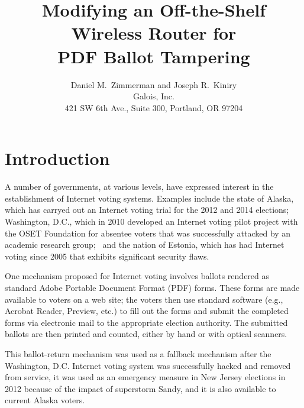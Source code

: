 \documentclass{article}
\newcommand{\eg}{e.g.,\xspace}
\newcommand{\etc}{etc.\xspace}
\begin{document}
\title{Modifying an Off-the-Shelf Wireless Router for \\ PDF Ballot Tampering}
\author{Daniel M.~Zimmerman and Joseph R.~Kiniry \\ Galois, Inc. \\
  421 SW 6th Ave., Suite 300, Portland, OR 97204}

\maketitle


\section{Introduction}

A number of governments, at various levels, have expressed interest in
the establishment of Internet voting systems. Examples include the
state of Alaska, which has carryed out an Internet voting trial for
the 2012 and 2014 elections; Washington, D.C., which in 2010 developed
an Internet voting pilot project with the OSET Foundation for absentee
voters that was successfully attacked by an academic research
group;~\cite{DCVoting} and the nation of Estonia, which has had
Internet voting since 2005 that exhibits significant security
flaws.~\cite{EstoniaEVoting}

One mechanism proposed for Internet voting involves ballots rendered
as standard Adobe Portable Document Format (PDF) forms. These forms
are made available to voters on a web site; the voters then use
standard software (\eg Acrobat Reader, Preview, \etc) to fill out the
forms and submit the completed forms via electronic mail to the
appropriate election authority. The submitted ballots are then printed
and counted, either by hand or with optical scanners.

This ballot-return mechanism was used as a fallback mechanism after
the Washington, D.C. Internet voting system was successfully hacked
and removed from service, it was used as an emergency measure in New
Jersey elections in 2012 because of the impact of superstorm Sandy,
and it is also available to current Alaska voters.
\end{document}
